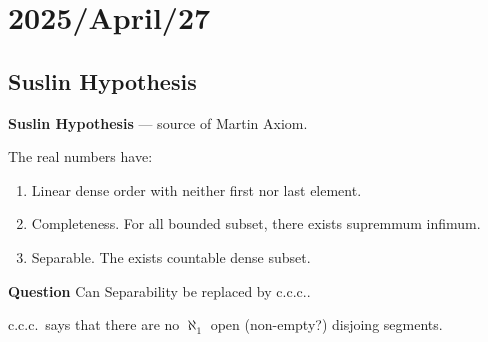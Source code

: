 \documentclass[11pt,pdftex,twoside,a4paper]{article}
\newcommand{\B}[1]{\textbf{#1}}
\newcommand{\ccc}{c.c.c.}
\theoremstyle{definition}
\begin{document}
\section{2025/April/27}


\subsection{Suslin Hypothesis}

\B{Suslin Hypothesis} --- source of Martin Axiom.

The real numbers \lrangle{\R, \leq} have:
\begin{enumerate}[label=(\alph*)]
\item Linear dense order with neither first nor last element.
\item Completeness. For all bounded subset, there exists supremmum infimum.
\item Separable. The exists countable dense subset.
\end{enumerate}

\B{Question} Can Separability be replaced by \ccc.

\ccc\ says that there are no \(\aleph_1\) open (non-empty?) disjoing segments.
\end{document}
